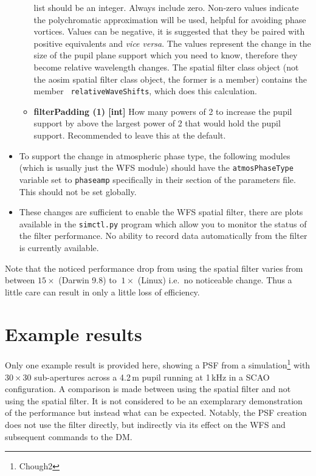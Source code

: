 \documentclass{article}
\begin{document}
\begin{itemize}
\begin{itemize}
      list should be an integer. Always include zero. Non-zero values
      indicate the polychromatic approximation will be used, helpful for
      avoiding phase vortices. Values can be negative, it is suggested that
      they be paired with positive equivalents and {\it vice versa}.
      The values represent the change in the size of the pupil plane support
      which you need to know, therefore they become relative wavelength
      changes. The spatial filter class object (not the aosim spatial filter
      class object, the former is a member) contains the member {\tt
      relativeWaveShifts}, which does this calculation.
      \item {\bf filterPadding (1) [int]} How many powers of 2 to increase the
      pupil support by above the largest power of 2 that would hold the 
      pupil support. Recommended to leave this at the default.
   \end{itemize}
   \item To support the change in atmospheric phase type, the following modules
   (which is usually just the WFS module) should have the {\tt atmosPhaseType}
   variable set to {\tt phaseamp} specifically in their section of the
   parameters file. This should not be set globally.
   \item These changes are sufficient to enable the WFS spatial filter,
   there are plots available in the {\tt simctl.py} program which allow you
   to monitor the status of the filter performance. No ability to record
   data automatically from the filter is currently available.
\end{itemize}

Note that the noticed performance drop from using the spatial filter varies
from between $15\times$ (Darwin 9.8) to $~1\times$ (Linux) i.e.~no noticeable
change. Thus a little care can result in only a little loss of efficiency.

\section{Example results}

Only one example result is provided here, showing a PSF from a
simulation\footnote{{\sc Chough2}} with $30\times30$ sub-apertures across a
4.2\,m pupil running at 1\,kHz in a SCAO configuration. A comparison is made
between using the spatial filter and not using the spatial filter. It is
not considered to be an exemplarary demonstration of the performance but
instead what can be expected. Notably, the PSF creation does not use the
filter directly, but indirectly via its effect on the WFS and subsequent
commands to the DM.
\end{document}
